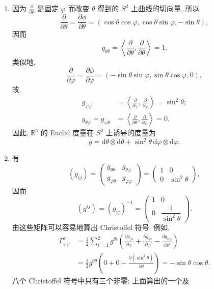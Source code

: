 \begin{description}[font=\normalfont,leftmargin=2em,labelwidth=1.5em]
\begin{enumerate}[label=(\alph*),ref=\alph*,leftmargin=*]
\item 因为 $\frac{\partial}{\partial\theta}$ 是固定 $\varphi$ 而改变 $\theta$ 得到的 $S^2$ 上曲线的切向量, 所以
\[
  \frac{\partial}{\partial\theta}=\frac{\partial\phi}{\partial\theta}
   =(\cos\theta\cos\varphi,\cos\theta\sin\varphi,-\sin\theta),
\]
因而
\[
  g_{\theta\theta}=\left\langle\frac{\partial}{\partial\theta},\frac{\partial}{\partial\theta}\right\rangle=1.
\]
类似地,
\[
  \frac{\partial}{\partial\varphi}=\frac{\partial\phi}{\partial\varphi}
   =(-\sin\theta\sin\varphi,\sin\theta\cos\varphi,0),
\]
故
\begin{align*}
  g_{\varphi\varphi}
  &=\left\langle\frac{\partial}{\partial\varphi},\frac{\partial}{\partial\varphi}\right\rangle=\sin^2\theta;\\
  g_{\theta\varphi}=g_{\varphi\theta}
  &=\left\langle\frac{\partial}{\partial\theta},\frac{\partial}{\partial\varphi}\right\rangle=0.
\end{align*}
因此, $\mathbb{R}^3$ 的 Euclid 度量在 $S^2$ 上诱导的度量为
\[
  g=\mathrm{d}\theta\otimes\mathrm{d}\theta+\sin^2\theta\,\mathrm{d}\varphi\otimes\mathrm{d}\varphi.
\]
\item 有
\[
  (g_{ij})=\begin{pmatrix}g_{\theta\theta}&g_{\theta\varphi}\\g_{\varphi\theta}&g_{\varphi\varphi}\end{pmatrix}
   =\begin{pmatrix}1&0\\0&\sin^2\theta\end{pmatrix},
\]
因而
\[
  (g^{ij})=(g_{ij})^{-1}=\begin{pmatrix}1&0\\0&\dfrac{1}{\sin^2\theta}\end{pmatrix}.
\]
由这些矩阵可以容易地算出 Christoffel 符号. 例如,
\begin{align*}
  \Gamma^\theta_{\varphi\varphi}
  &=\frac12\sum_{i=1}^2g^{\theta i}
    \left(\frac{\partial g_{\varphi i}}{\partial\varphi}
         +\frac{\partial g_{\varphi i}}{\partial\varphi}
         -\frac{\partial g_{\varphi\varphi}}{\partial x^i}\right)\\
  &=\frac12 g^{\theta\theta}\left(0+0-\frac{\partial(\sin^2\theta)}{\partial\theta}\right)
    =-\sin\theta\cos\theta.
\end{align*}
八个 Christoffel 符号中只有三个非零: 上面算出的一个及

\end{enumerate}
\end{description}
